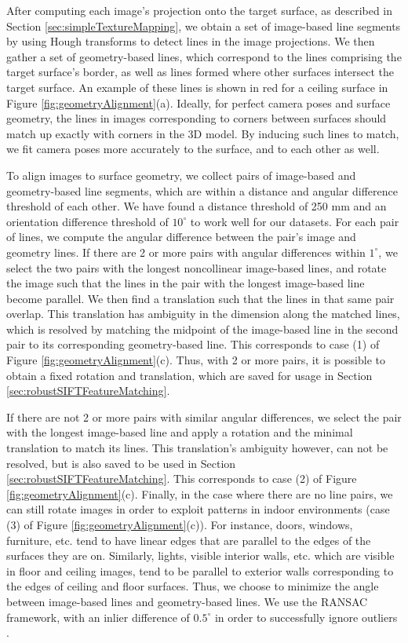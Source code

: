 \documentclass[]{spie}  %
\begin{document}
After computing each image's projection onto the target surface, as
described in Section \ref{sec:simpleTextureMapping}, we obtain a set
of image-based line segments by using Hough transforms to detect lines
in the image projections. We then gather a set of geometry-based
lines, which correspond to the lines comprising the target surface's
border, as well as lines formed where other surfaces intersect the
target surface. An example of these lines is shown in red for a
ceiling surface in Figure \ref{fig:geometryAlignment}(a). Ideally, for
perfect camera poses and surface geometry, the lines in images
corresponding to corners between surfaces should match up exactly with
corners in the 3D model. By inducing such lines to match, we fit
camera poses more accurately to the surface, and to each other as
well.

To align images to surface geometry, we collect pairs of image-based
and geometry-based line segments, which are within a distance and
angular difference threshold of each other. We have found a distance
threshold of 250 mm and an orientation difference threshold of
$10^\circ$ to work well for our datasets. For each pair of lines, we
compute the angular difference between the pair's image and geometry
lines. If there are 2 or more pairs with angular differences within
$1^\circ$, we select the two pairs with the longest noncollinear
image-based lines, and rotate the image such that the lines in the
pair with the longest image-based line become parallel. We then find a
translation such that the lines in that same pair overlap. This
translation has ambiguity in the dimension along the matched lines,
which is resolved by matching the midpoint of the image-based line in
the second pair to its corresponding geometry-based line. This
corresponds to case (1) of Figure
\ref{fig:geometryAlignment}(c). Thus, with 2 or more pairs, it is
possible to obtain a fixed rotation and translation, which are saved
for usage in Section \ref{sec:robustSIFTFeatureMatching}.

If there are not 2 or more pairs with similar angular differences, we
select the pair with the longest image-based line and apply a rotation
and the minimal translation to match its lines. This translation's
ambiguity however, can not be resolved, but is also saved to be used
in Section \ref{sec:robustSIFTFeatureMatching}. This corresponds to
case (2) of Figure \ref{fig:geometryAlignment}(c). Finally, in the
case where there are no line pairs, we can still rotate images in
order to exploit patterns in indoor environments (case (3) of Figure
\ref{fig:geometryAlignment}(c)). For instance, doors, windows,
furniture, etc. tend to have linear edges that are parallel to the
edges of the surfaces they are on. Similarly, lights, visible interior
walls, etc. which are visible in floor and ceiling images, tend to be
parallel to exterior walls corresponding to the edges of ceiling and
floor surfaces. Thus, we choose to minimize the angle between
image-based lines and geometry-based lines. We use the RANSAC
framework, with an inlier difference of $0.5^\circ$ in order to
successfully ignore outliers \cite{fischler1981random}.
\end{document}
